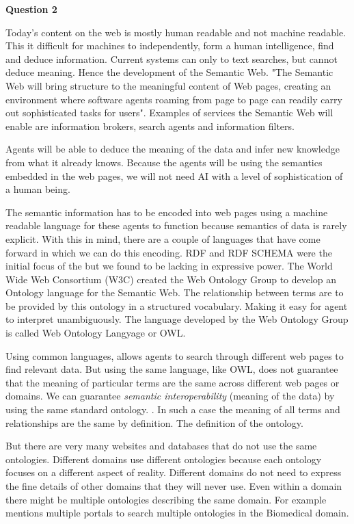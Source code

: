 \documentclass[12pt,a4paper]{article}
\begin{document}
\textbf{Question 2}
\newline

Today's content on the web is mostly human readable and not machine readable. This it difficult for machines to independently, form a human intelligence, find and deduce information. Current systems can only to text searches, but cannot deduce meaning. Hence the development of the Semantic Web. "The Semantic Web will bring structure to the meaningful content of Web pages, creating an environment where software agents roaming from page to page can readily carry out sophisticated tasks for users". \citep{lee2001} Examples of services the Semantic Web will enable are information brokers, search agents and information filters. \citep{Decker} 

Agents will be able to deduce the meaning of the data and infer new knowledge from what it already knows. Because the agents will be using the semantics embedded in the web pages, we will not need AI with a level of sophistication of a human being. \citep{lee2001}

The semantic information has to be encoded into web pages using a machine readable language for these agents to function because semantics of data is rarely explicit. \citep{Heiler1995a}  With this in mind, there are a couple of languages that have come forward in which we can do this encoding. RDF and RDF SCHEMA were the initial focus of the but we found to be lacking in expressive power. The World Wide Web Consortium (W3C) created the Web Ontology Group to develop an Ontology language for the Semantic Web. The relationship between terms are to be provided by this ontology in a structured vocabulary. Making it easy for agent to interpret unambiguously. \citep{Horrocks2003} The language developed by the Web Ontology Group is called Web Ontology Langyage or OWL.

Using common languages, allows agents to search through different web pages to find relevant data. But using the same language, like OWL, does not guarantee that the meaning of particular terms are the same across different web pages or domains. We can guarantee \emph{semantic interoperability} (meaning of the data) by using the same standard ontology. \citep{VanDiggelen2007}. In such a case the meaning of all terms and relationships are the same by definition. The definition of the ontology.

But there are very many websites and databases that do not use the same ontologies. Different domains use different ontologies because each ontology focuses on a different aspect of reality.\citep{can} Different domains do not need to express the fine details of other domains that they will never use. Even within a domain there might be multiple ontologies describing the same domain. For example \cite{gros2014} mentions multiple portals to search multiple ontologies in the Biomedical domain.
\end{document}
